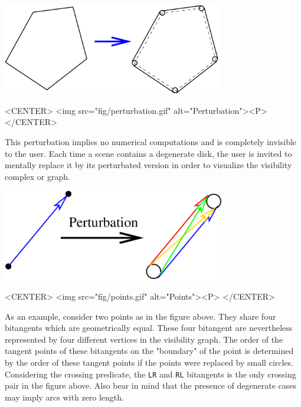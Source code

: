 \begin{ccTexOnly}
    \begin{center}
        \includegraphics[height=4cm]{Visibility_complex_2/fig/perturbation}%
    \end{center}
\end{ccTexOnly}

\begin{ccHtmlOnly}
    <CENTER>
        <img src="fig/perturbation.gif" alt="Perturbation"><P>
    </CENTER>
\end{ccHtmlOnly}

This perturbation implies no numerical computations and is completely
invisible to the user. Each time a scene contains a degenerate disk, the user
is invited to mentally replace it by its perturbated version in order to
visualize the visibility complex or graph. 

\begin{ccTexOnly}
    \begin{center}
        \includegraphics[height=4cm]{Visibility_complex_2/fig/points}%
    \end{center}
\end{ccTexOnly}

\begin{ccHtmlOnly}
    <CENTER>
        <img src="fig/points.gif" alt="Points"><P>
    </CENTER>
\end{ccHtmlOnly}

As an example, consider two points as in the figure above. They share four
bitangents which are geometrically equal. These four bitangent are
nevertheless represented by four different vertices in the visibility
graph. The order of the tangent points of these bitangents on the
"boundary" of the point is determined by the order of these tangent points
if the points were replaced by small circles. Considering the crossing
predicate, the \texttt{LR} and \texttt{RL} bitangents is the only crossing
pair in the figure above.  Also bear in mind that the presence of
degenerate cases may imply arcs with zero length.

